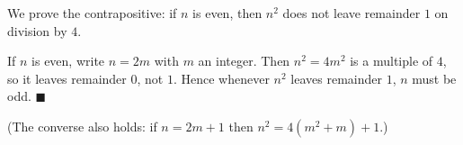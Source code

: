 We prove the contrapositive: if $n$ is even, then $n^2$ does not leave remainder $1$ on division by $4$.

If $n$ is even, write $n=2m$ with $m$ an integer. Then $n^2=4m^2$ is a multiple of $4$, so it leaves remainder $0$, not $1$. Hence whenever $n^2$ leaves remainder $1$, $n$ must be odd. $\blacksquare$

(The converse also holds: if $n=2m+1$ then $n^2=4(m^2+m)+1$.)
